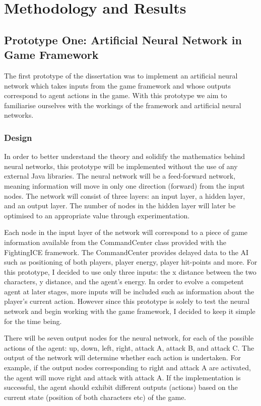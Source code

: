 \documentclass[12pt,a4paper]{article}
\begin{document}
\section{Methodology and Results}
\subsection{Prototype One: Artificial Neural Network in Game Framework}
The first prototype of the dissertation was to implement an artificial neural network which takes inputs from the game framework and whose outputs correspond to agent actions in the game. With this prototype we aim to familiarise ourselves with the workings of the framework and artificial neural networks. 
\subsubsection{Design}
In order to better understand the theory and solidify the mathematics behind neural networks, this prototype will be implemented without the use of any external Java libraries. The neural network will be a feed-forward network, meaning information will move in only one direction (forward) from the input nodes. The network will consist of three layers: an input layer, a hidden layer, and an output layer. The number of nodes in the hidden layer will later be optimised to an appropriate value through experimentation.

Each node in the input layer of the network will correspond to a piece of game information available from the CommandCenter class provided with the FightingICE framework. The CommandCenter provides delayed data to the AI such as positioning of both players, player energy, player hit-points and more. For this prototype, I decided to use only three inputs: the x distance between the two characters, y distance, and the agent's energy. In order to evolve a competent agent at later stages, more inputs will be included such as information about the player's current action. However since this prototype is solely to test the neural network and begin working with the game framework, I decided to keep it simple for the time being.

\begin{figure}[h]
\end{figure}
\newpage
There will be seven output nodes for the neural network, for each of the possible actions of the agent: up, down, left, right, attack A, attack B, and attack C. The output of the network will determine whether each action is undertaken. For example, if the output nodes corresponding to right and attack A are activated, the agent will move right and attack with attack A. If the implementation is successful, the agent should exhibit different outputs (actions) based on the current state (position of both characters etc) of the game.
\end{document}
